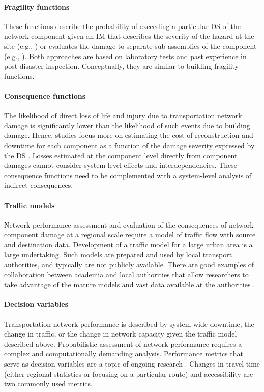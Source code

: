 \paragraph{Fragility functions} These functions describe the probability of exceeding a particular DS of the network component given an IM that describes the severity of the hazard at the site (e.g., \cite{balomenos2020parametrized}) or evaluates the damage to separate sub-assemblies of the component (e.g., \cite{nielson2007seismic, simon2016seismic}). Both approaches are based on laboratory tests and past experience in post-disaster inspection. Conceptually, they are similar to building fragility functions.

\paragraph{Consequence functions} The likelihood of direct loss of life and injury due to transportation network damage is significantly lower than the likelihood of such events due to building damage. Hence, studies focus more on estimating the cost of reconstruction and downtime for each component as a function of the damage severity expressed by the DS \citep{stergiou2006treatment, gidaris2017probabilistic}. Losses estimated at the component level directly from component damages cannot consider system-level effects and interdependencies. These consequence functions need to be complemented with a system-level analysis of indirect consequences.

\paragraph{Traffic models} Network performance assessment and evaluation of the consequences of network component damage at a regional scale require a model of traffic flow with source and destination data. Development of a traffic model for a large urban area is a large undertaking. Such models are prepared and used by local transport authorities, and typically are not publicly available. There are good examples of collaboration between academia and local authorities that allow researchers to take advantage of the mature models and vast data available at the authorities \citep{miller2015ground}.

\paragraph{Decision variables} Transportation network performance is described by system-wide downtime, the change in traffic, or the change in network capacity given the traffic model described above. Probabilistic assessment of network performance requires a complex and computationally demanding analysis. Performance metrics that serve as decision variables are a topic of ongoing research \citep{miller2015ground, millerhooks2012measuring}. Changes in travel time (either regional statistics or focusing on a particular route) and accessibility are two commonly used metrics.

